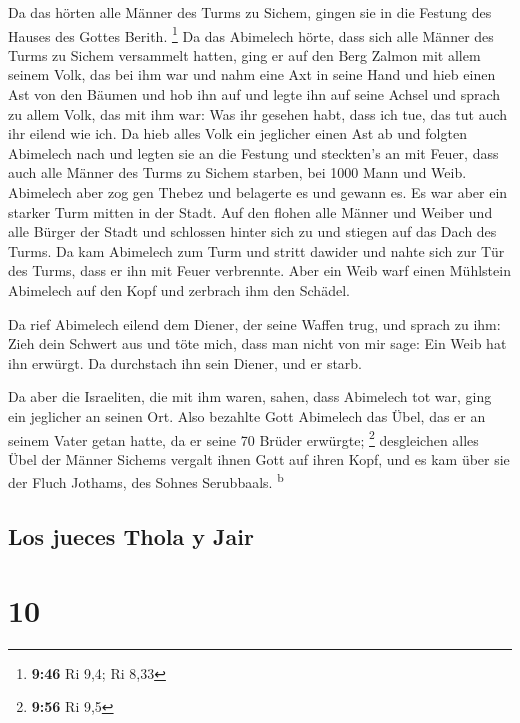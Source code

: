  Da das hörten alle Männer des Turms zu Sichem, gingen
sie in die Festung des Hauses des Gottes Berith. \footnote{\textbf{9:46}
  Ri 9,4; Ri 8,33}  Da das Abimelech hörte, dass sich
alle Männer des Turms zu Sichem versammelt hatten,  ging
er auf den Berg Zalmon mit allem seinem Volk, das bei ihm war und nahm
eine Axt in seine Hand und hieb einen Ast von den Bäumen und hob ihn auf
und legte ihn auf seine Achsel und sprach zu allem Volk, das mit ihm
war: Was ihr gesehen habt, dass ich tue, das tut auch ihr eilend wie
ich.  Da hieb alles Volk ein jeglicher einen Ast ab und
folgten Abimelech nach und legten sie an die Festung und steckten's an
mit Feuer, dass auch alle Männer des Turms zu Sichem starben, bei 1000
Mann und Weib.  Abimelech aber zog gen Thebez und
belagerte es und gewann es.  Es war aber ein starker Turm
mitten in der Stadt. Auf den flohen alle Männer und Weiber und alle
Bürger der Stadt und schlossen hinter sich zu und stiegen auf das Dach
des Turms.  Da kam Abimelech zum Turm und stritt dawider
und nahte sich zur Tür des Turms, dass er ihn mit Feuer verbrennte.
 Aber ein Weib warf einen Mühlstein Abimelech auf den
Kopf und zerbrach ihm den Schädel.

 Da rief Abimelech eilend dem Diener, der seine Waffen
trug, und sprach zu ihm: Zieh dein Schwert aus und töte mich, dass man
nicht von mir sage: Ein Weib hat ihn erwürgt. Da durchstach ihn sein
Diener, und er starb.

 Da aber die Israeliten, die mit ihm waren, sahen, dass
Abimelech tot war, ging ein jeglicher an seinen Ort. 
Also bezahlte Gott Abimelech das Übel, das er an seinem Vater getan
hatte, da er seine 70 Brüder erwürgte; \footnote{\textbf{9:56} Ri 9,5}
 desgleichen alles Übel der Männer Sichems vergalt ihnen
Gott auf ihren Kopf, und es kam über sie der Fluch Jothams, des Sohnes
Serubbaals. \textsuperscript{b}

\hypertarget{los-jueces-thola-y-jair}{%
\subsection{Los jueces Thola y Jair}\label{los-jueces-thola-y-jair}}

\hypertarget{section-9}{%
\section{10}\label{section-9}}

